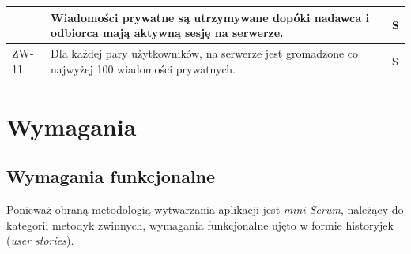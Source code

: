 \begin{tabular}{ | l | l | l | }
{    } & \parbox[t]{12.1cm}{\strut
      Wiadomości prywatne są utrzymywane dopóki nadawca i odbiorca mają aktywną
      sesję na serwerze.

    \strut} & \parbox{1.8cm}{
      S

    } \\

    \hline
    \parbox{1.2cm}{
      ZW-11

    } & \parbox[t]{12.1cm}{\strut
      Dla każdej pary użytkowników, na serwerze jest
      gromadzone co najwyżej 100 wiadomości prywatnych.

    \strut} & \parbox{1.8cm}{
      S

    } \\
    \hline
  \end{tabular}

\newpage

\section{Wymagania}
\label{program_viuachat_wymagania}

\subsection{Wymagania funkcjonalne}

Ponieważ obraną metodologią wytwarzania aplikacji jest \textit{mini-Scrum}, należący do kategorii metodyk zwinnych, wymagania funkcjonalne ujęto w formie historyjek (\textit{user stories}).

\vspace{1em}

